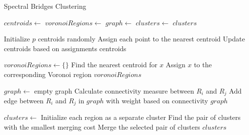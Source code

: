 \documentclass{article}
\begin{document}
	
\begin{algorithm}
	\caption{Spectral Bridges Clustering}
	\begin{algorithmic}
		 
		\State $centroids \gets$  
		\State $voronoiRegions \gets$  
		\State $graph \gets$  
		\State $clusters \gets$  
		\State \Return $clusters$
		\EndProcedure
		
		\State Initialize $p$ centroids randomly
		\Repeat
		\State Assign each point to the nearest centroid
		\State Update centroids based on assignments
		\State \Return centroids
		\EndProcedure
		
		\State $voronoiRegions \gets \{\}$
		\State Find the nearest centroid for $x$
		\State Assign $x$ to the corresponding Voronoi region
		\EndFor
		\State \Return $voronoiRegions$
		\EndProcedure
		
		\State $graph \gets$ empty graph
		\State Calculate connectivity measure between $R_i$ and $R_j$
		\State Add edge between $R_i$ and $R_j$ in $graph$ with weight based on connectivity
		\EndFor
		\State \Return $graph$
		\EndProcedure
		
		\State $clusters \gets$ Initialize each region as a separate cluster
		\Repeat
		\State Find the pair of clusters with the smallest merging cost
		\State Merge the selected pair of clusters
		\State \Return $clusters$
		\EndProcedure
	\end{algorithmic}
\end{algorithm}
\end{document}

